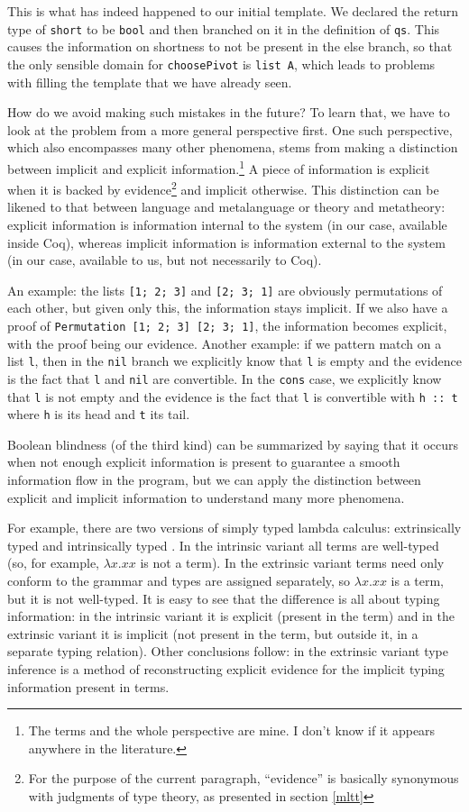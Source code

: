 \documentclass[declaration,mgr,english,shortabstract]{iithesis}
\newcommand{\m}[1]{\texttt{#1}}
\begin{document}
This is what has indeed happened to our initial template. We declared the return type of \m{short} to be \m{bool} and then branched on it in the definition of \m{qs}. This causes the information on shortness to not be present in the else branch, so that the only sensible domain for \m{choosePivot} is \m{list A}, which leads to problems with filling the template that we have already seen.

How do we avoid making such mistakes in the future? To learn that, we have to look at the problem from a more general perspective first. One such perspective, which also encompasses many other phenomena, stems from making a distinction between implicit and explicit information.\footnote{The terms and the whole perspective are mine. I don't know if it appears anywhere in the literature.} A piece of information is explicit when it is backed by evidence\footnote{For the purpose of the current paragraph, ``evidence'' is basically synonymous with judgments of type theory, as presented in section \ref{mltt}} and implicit otherwise. This distinction can be likened to that between language and metalanguage or theory and metatheory: explicit information is information internal to the system (in our case, available inside Coq), whereas implicit information is information external to the system (in our case, available to us, but not necessarily to Coq).

An example: the lists \m{[1; 2; 3]} and \m{[2; 3; 1]} are obviously permutations of each other, but given only this, the information stays implicit. If we also have a proof of \m{Permutation [1; 2; 3] [2; 3; 1]}, the information becomes explicit, with the proof being our evidence. Another example: if we pattern match on a list \m{l}, then in the \m{nil} branch we explicitly know that \m{l} is empty and the evidence is the fact that \m{l} and \m{nil} are convertible. In the \m{cons} case, we explicitly know that \m{l} is not empty and the evidence is the fact that \m{l} is convertible with \m{h\ ::\ t} where \m{h} is its head and \m{t} its tail.

Boolean blindness (of the third kind) can be summarized by saying that it occurs when not enough explicit information is present to guarantee a smooth information flow in the program, but we can apply the distinction between explicit and implicit information to understand many more phenomena.

For example, there are two versions of simply typed lambda calculus: extrinsically typed and intrinsically typed \cite{IntrinsicExtrinsic}. In the intrinsic variant all terms are well-typed (so, for example, $\lambda x.xx$ is not a term). In the extrinsic variant terms need only conform to the grammar and types are assigned separately, so $\lambda x.xx$ is a term, but it is not well-typed. It is easy to see that the difference is all about typing information: in the intrinsic variant it is explicit (present in the term) and in the extrinsic variant it is implicit (not present in the term, but outside it, in a separate typing relation). Other conclusions follow: in the extrinsic variant type inference is a method of reconstructing explicit evidence for the implicit typing information present in terms.
\end{document}
